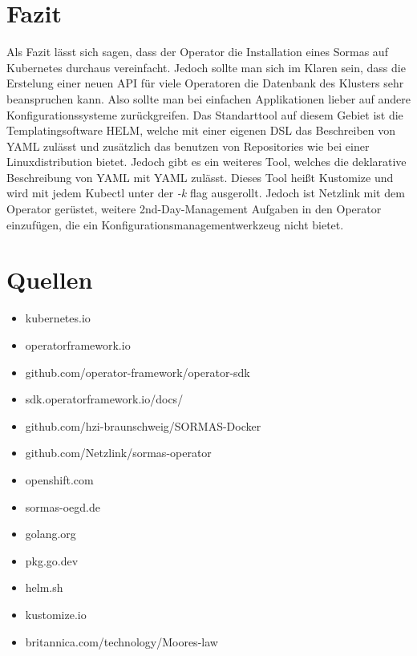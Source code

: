 \documentclass[a4paper,11pt]{article}
\begin{document}
  \section{Fazit}
  Als Fazit lässt sich sagen, dass der Operator die Installation eines Sormas 
  auf Kubernetes durchaus vereinfacht. Jedoch sollte man sich im Klaren sein, dass die 
  Erstelung einer neuen API für viele Operatoren die Datenbank des Klusters sehr beanspruchen kann.
  Also sollte man bei einfachen Applikationen lieber auf andere Konfigurationssysteme zurückgreifen.
  Das Standarttool auf diesem Gebiet ist die Templatingsoftware HELM, welche mit einer eigenen DSL das 
  Beschreiben von YAML zulässt und zusätzlich das benutzen von Repositories wie bei  einer Linuxdistribution bietet.
  Jedoch gibt es ein weiteres Tool, welches die deklarative Beschreibung von YAML mit YAML zulässt.
  Dieses Tool heißt Kustomize und wird mit jedem Kubectl unter der \emph{-k} flag ausgerollt. Jedoch ist
  Netzlink mit dem Operator gerüstet, weitere 2nd-Day-Management Aufgaben in den Operator einzufügen, die ein Konfigurationsmanagementwerkzeug
  nicht bietet.  
  \section{Quellen}
  \begin{itemize}
      \item kubernetes.io \date{07.07.2020}
      \item operatorframework.io \date{01.07.2020}
      \item github.com/operator-framework/operator-sdk \date{01.07.2020}
      \item sdk.operatorframework.io/docs/ \date{05.07.2020}
      \item github.com/hzi-braunschweig/SORMAS-Docker \date{13.07.2020}
      \item github.com/Netzlink/sormas-operator \date{13.07.2020}
      \item openshift.com \date{13.07.2020}
      \item sormas-oegd.de \date{08.07.2020}
      \item golang.org \date{02.07.2020}
      \item pkg.go.dev \date{04.06.2020}
      \item helm.sh \date{13.06.2020}
      \item kustomize.io \date{13.06.2020}
      \item britannica.com/technology/Moores-law \date{13.06.2020}
  \end{itemize}
\end{document}
